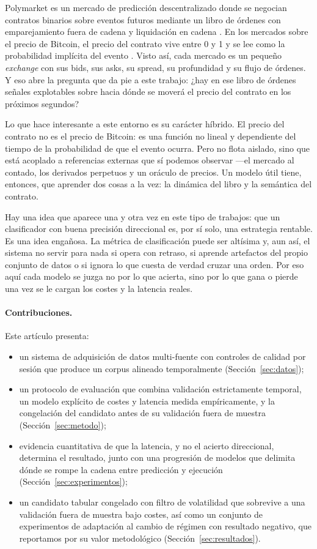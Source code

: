 \documentclass[11pt,a4paper]{article}
\begin{document}
Polymarket es un mercado de predicción descentralizado donde se negocian contratos
binarios sobre eventos futuros mediante un libro de órdenes con emparejamiento
fuera de cadena y liquidación en cadena \cite{polymarket_trading}. En los mercados
sobre el precio de Bitcoin, el precio del contrato vive entre 0 y 1 y se lee como
la probabilidad implícita del evento \cite{polymarket_prices}. Visto así, cada
mercado es un pequeño \emph{exchange} con sus bids, sus asks, su spread, su
profundidad y su flujo de órdenes. Y eso abre la pregunta que da pie a este
trabajo: ¿hay en ese libro de órdenes señales explotables sobre hacia dónde se
moverá el precio del contrato en los próximos segundos?

Lo que hace interesante a este entorno es su carácter híbrido. El precio del
contrato no es el precio de Bitcoin: es una función no lineal y dependiente del
tiempo de la probabilidad de que el evento ocurra. Pero no flota aislado, sino que
está acoplado a referencias externas que sí podemos observar ---el mercado al
contado, los derivados perpetuos y un oráculo de precios. Un modelo útil tiene,
entonces, que aprender dos cosas a la vez: la dinámica del libro y la semántica del
contrato.

Hay una idea que aparece una y otra vez en este tipo de trabajos: que un
clasificador con buena precisión direccional es, por sí solo, una estrategia
rentable. Es una idea engañosa. La métrica de clasificación puede ser altísima y,
aun así, el sistema no servir para nada si opera con retraso, si aprende artefactos
del propio conjunto de datos o si ignora lo que cuesta de verdad cruzar una orden.
Por eso aquí cada modelo se juzga no por lo que acierta, sino por lo que gana o
pierde una vez se le cargan los costes y la latencia reales.

\paragraph{Contribuciones.} Este artículo presenta:
\begin{itemize}
  \item un sistema de adquisición de datos multi-fuente con controles de calidad
  por sesión que produce un corpus alineado temporalmente (Sección~\ref{sec:datos});
  \item un protocolo de evaluación que combina validación estrictamente temporal,
  un modelo explícito de costes y latencia medida empíricamente, y la
  congelación del candidato antes de su validación fuera de muestra
  (Sección~\ref{sec:metodo});
  \item evidencia cuantitativa de que la latencia, y no el acierto direccional,
  determina el resultado, junto con una progresión de modelos que delimita dónde
  se rompe la cadena entre predicción y ejecución (Sección~\ref{sec:experimentos});
  \item un candidato tabular congelado con filtro de volatilidad que sobrevive a
  una validación fuera de muestra bajo costes, así como un conjunto de
  experimentos de adaptación al cambio de régimen con resultado negativo, que
  reportamos por su valor metodológico (Sección~\ref{sec:resultados}).
\end{itemize}
\end{document}
